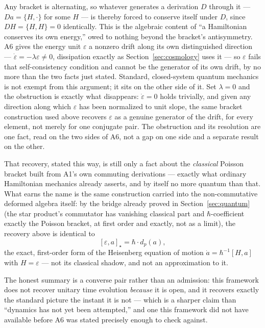 \documentclass[pdflatex,sn-mathphys-num]{sn-jnl}
\theoremstyle{thmstyleone}
\theoremstyle{thmstylethree}
\theoremstyle{thmstyletwo}
\begin{document}
Any bracket is alternating, so whatever generates a derivation $D$ through
it — $Da = \{H,\cdot\}$ for some $H$ — is thereby forced to conserve
itself under $D$, since $DH=\{H,H\}=0$ identically. This is the algebraic
content of ``a Hamiltonian conserves its own energy,'' owed to nothing
beyond the bracket's antisymmetry. A6 gives the energy unit $\varepsilon$
a nonzero drift along its own distinguished direction —
$\dot\varepsilon=-\lambda\varepsilon\ne0$, dissipation exactly as
Section~\ref{sec:cosmology} uses it — so $\varepsilon$ fails that
self-consistency condition and cannot be the generator of its own drift,
by no more than the two facts just stated. Standard, closed-system
quantum mechanics is not exempt from this argument; it sits on the other
side of it. Set $\lambda=0$ and the obstruction is exactly what
disappears: $\dot\varepsilon=0$ holds trivially, and given any direction
along which $\varepsilon$ has been normalized to unit slope, the same
bracket construction used above recovers $\varepsilon$ as a genuine
generator of the drift, for every element, not merely for one conjugate
pair. The obstruction and its resolution are one fact, read on the two
sides of A6, not a gap on one side and a separate result on the other.

That recovery, stated this way, is still only a fact about the
\emph{classical} Poisson bracket built from A1's own commuting
derivations — exactly what ordinary Hamiltonian mechanics already
asserts, and by itself no more quantum than that. What earns the name is
the same construction carried into the non-commutative deformed algebra
itself: by the bridge already proved in Section~\ref{sec:quantum}
(the star product's commutator has vanishing classical part and
$\hbar$-coefficient exactly the Poisson bracket, at first order and
exactly, not as a limit), the recovery above is identical to
\[
[\varepsilon,a]_\star = \hbar\cdot d_p(a),
\]
the exact, first-order form of the Heisenberg equation of motion
$\dot a=\hbar^{-1}[H,a]$ with $H=\varepsilon$ — not its classical shadow,
and not an approximation to it.

The honest summary is a converse pair rather than an admission: this
framework does not recover unitary time evolution \emph{because} it is
open, and it recovers exactly the standard picture the instant it is not
— which is a sharper claim than ``dynamics has not yet been attempted,''
and one this framework did not have available before A6 was stated
precisely enough to check against.

\end{document}
